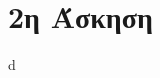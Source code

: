 \documentclass[assignment1.tex]{subfiles}
\begin{document}
\section*{2η Άσκηση}

d



\end{document}
